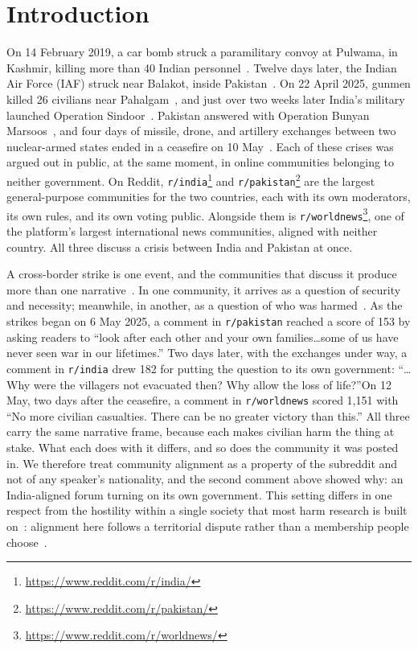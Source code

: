 \providecommand{\candidate}[1]{}

\section{Introduction}
\label{sec:intro}

On 14 February 2019, a car bomb struck a paramilitary convoy at Pulwama, in Kashmir, killing more than 40 Indian personnel~\cite{aljazeera2019pulwama}. Twelve days later, the Indian Air Force (IAF) struck near Balakot, inside Pakistan~\cite{aljazeera2019balakot}. On 22 April 2025, gunmen killed 26 civilians near Pahalgam~\cite{aljazeera2025pahalgam}, and just over two weeks later India's military launched Operation Sindoor~\cite{aljazeera2025sindoor}. Pakistan answered with Operation Bunyan Marsoos~\cite{aljazeera2025bunyan}, and four days of missile, drone, and artillery exchanges between two nuclear-armed states ended in a ceasefire on 10 May~\cite{aljazeera2025ceasefire}. Each of these crises was argued out in public, at the same moment, in online communities belonging to neither government. On Reddit, \texttt{r/india}\footnote{\url{https://www.reddit.com/r/india/}} and \texttt{r/pakistan}\footnote{\url{https://www.reddit.com/r/pakistan/}} are the largest general-purpose communities for the two countries, each with its own moderators, its own rules, and its own voting public. Alongside them is \texttt{r/worldnews}\footnote{\url{https://www.reddit.com/r/worldnews/}}, one of the platform's largest international news communities, aligned with neither country. All three discuss a crisis between India and Pakistan at once.

A cross-border strike is one event, and the communities that discuss it produce more than one narrative~\cite{entman1991kal,tyagi2020ipconflict}. In one community, it arrives as a question of security and necessity; meanwhile, in another, as a question of who was harmed~\cite{makhortykh2017visual}. As the strikes began on 6 May 2025, a comment in \texttt{r/pakistan} reached a score of 153 by asking readers to ``look after each other and your own families\ldots some of us have never seen war in our lifetimes.'' Two days later, with the exchanges under way, a comment in \texttt{r/india} drew 182 for putting the question to its own government: ``\ldots Why were the villagers not evacuated then? Why allow the loss of life?''On 12 May, two days after the ceasefire, a comment in \texttt{r/worldnews} scored 1,151 with ``No more civilian casualties. There can be no greater victory than this.'' All three carry the same narrative frame, because each makes civilian harm the thing at stake. What each does with it differs, and so does the community it was posted in. We therefore treat community alignment as a property of the subreddit and not of any speaker's nationality, and the second comment above showed why: an India-aligned forum turning on its own government. This setting differs in one respect from the hostility within a single society that most harm research is built on~\cite{zampieri2019olid,davidson2017hatespeech,salehabadi2022user,aleksandric2025power}: alignment here follows a territorial dispute rather than a membership people choose~\cite{fang2022indivisibility}.

